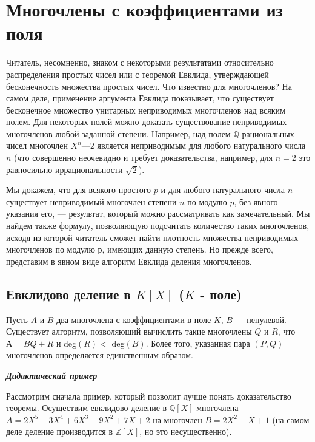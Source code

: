 \section{Многочлены с коэффициентами из поля}
Читатель, несомненно, знаком с некоторыми результатами  
относительно распределения простых чисел или с теоремой Евклида,  
утверждающей бесконечность множества простых чисел. Что известно для  
многочленов? На самом деле, применение аргумента Евклида  
показывает, что существует бесконечное множество унитарных неприводимых 
многочленов над всяким полем. Для некоторых полей можно доказать 
существование неприводимых многочленов любой заданной степени. 
Например, над полем $\mathbb{Q}$ рациональных чисел многочлен $X^n — 2$  
является неприводимым для любого натурального числа $n$ (что совершенно 
неочевидно и требует доказательства, например, для $n = 2$ это  
равносильно иррациональности $\sqrt{2}$). 

Мы докажем, что для всякого простого $p$ и для любого  
натурального числа $n$ существует неприводимый многочлен степени $n$ по модулю 
$p$, без явного указания его, — результат, который можно  
рассматривать как замечательный. Мы найдем также формулу, позволяющую 
подсчитать количество таких многочленов, исходя из которой  
читатель сможет найти плотность множества неприводимых многочленов 
по модулю р, имеющих данную степень. Но прежде всего, представим 
в явном виде алгоритм Евклида деления многочленов. 
\pagebreak

\subsection{Евклидово деление в $K[X]$ ($K$ - поле)}

\begin{thm}
\hspace*{15pt}Пусть $A$ и $B$ два многочлена с коэффициентами в поле $K$, $B$ —  
ненулевой. Существует алгоритм, позволяющий вычислить такие  
многочлены $Q$ и $R$, что $А = BQ + R $ и deg$(R) < $ deg$(B)$. Более того, указанная 
пара $(P, Q)$ многочленов определяется единственным образом.
\end{thm}

\noindent\textbf{\textit{Дидактический пример}}

Рассмотрим сначала пример, который позволит лучше понять  
доказательство теоремы. Осуществим евклидово деление в $\mathbb{Q}[X]$ многочлена 
$A = 2X^5 - 3X^4 + 6X^3 - 9X^2 + 7X + 2$ на многочлен $B = 2X^2 - X + 1$ 
(на самом деле деление производится в $\mathbb{Z}[X]$, но это несущественно). 


